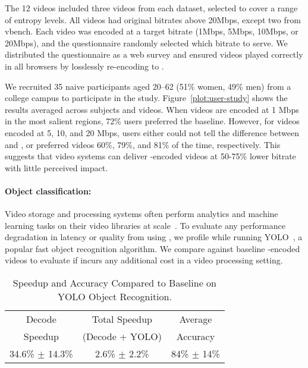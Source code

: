 The 12 videos included three videos from each dataset, selected to cover a range of entropy levels.
All videos had original bitrates above 20Mbps, except two from vbench.
Each video was encoded at a target bitrate (1Mbps, 5Mbps, 10Mbps, or 20Mbps), and the questionnaire randomly selected which bitrate to serve.
We distributed the questionnaire as a web survey and ensured videos played correctly in all browsers by losslessly re-encoding to \avc.

We recruited 35 naive participants aged 20--62 (51\% women, 49\% men) from a college campus to participate in the study.
Figure~\ref{plot:user-study} shows the results averaged across subjects and videos.
When \name videos are encoded at 1 Mbps in the most salient regions, 72\% users preferred the \hevc baseline.
However, for \name videos encoded at 5, 10, and 20 Mbps, users either could not tell the difference between \hevc and \name, or preferred \name videos 60\%, 79\%, and 81\% of the time, respectively.
This suggests that video systems can deliver \name-encoded videos at 50-75\% lower bitrate with little perceived impact.

\userStudyFigure



\paragraph{Object classification: } Video storage and processing systems often perform analytics and machine learning tasks on their video libraries at scale~\cite{poms2018scanner,shen2017deepvideo,zhang2017livevideoanalytics}.
To evaluate any performance degradation in latency or quality from using \nameCompress, we profile \name while running  YOLO~\cite{redmon2017yolo}, a popular fast object recognition algorithm.
We compare against baseline \hevc-encoded videos to evaluate if \name incurs any additional cost in a video processing setting.

\begin{table}[h]
  \centering
  \caption{\name Speedup and Accuracy Compared to \hevc Baseline on YOLO Object Recognition.}
  \label{table:yolo}
\begin{tabular}{ccc} \toprule
  Decode              & Total Speedup             &  Average    \\
  Speedup             & (Decode + YOLO)           & Accuracy \\ \midrule
  34.6\% $\pm$ 14.3\% & 2.6\% $\pm$ 2.2\% & 84\% $\pm$ 14\% \\ \bottomrule
\end{tabular}
\end{table}

